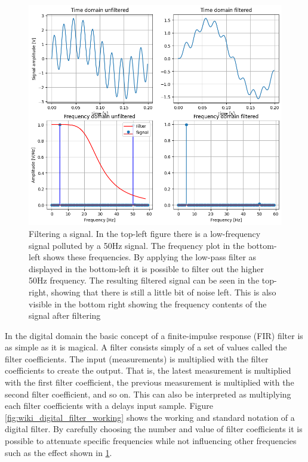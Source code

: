 \begin{figure}[h!t]
	\begin{center}
		\includegraphics[width=1.0\columnwidth]{images/filter_example.png}
	\end{center}
	\caption{Filtering a signal. In the top-left figure there is a low-frequency signal polluted by a 50Hz signal. The frequency plot in the bottom-left shows these frequencies. By applying the low-pass filter as displayed in the bottom-left it is possible to filter out the higher 50Hz frequency. The resulting filtered signal can be seen in the top-right, showing that there is still a little bit of noise left. This is also visible in the bottom right showing the frequency contents of the signal after filtering}
	\label{fig:filter_example}
\end{figure}

In the digital domain the basic concept of a finite-impulse response (FIR) filter is as simple as it is magical. A filter consists simply of a set of values called the filter coefficients. The input (measurements) is multiplied with the filter coefficients to create the output. That is, the latest measurement is multiplied with the first filter coefficient, the previous measurement is multiplied with the second filter coefficient, and so on. This can also be interpreted as multiplying each filter coefficients with a delays input sample. Figure \ref{fig:wiki_digital_filter_working} shows the working and standard notation of a digital filter.
By carefully choosing the number and value of filter coefficients it is possible to attenuate specific frequencies while not influencing other frequencies such as the effect shown in \ref{fig:filter_example}.

